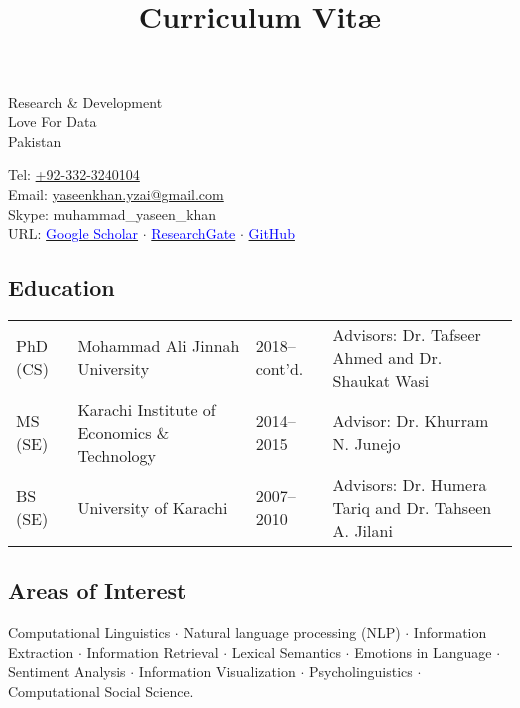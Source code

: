 \documentclass[a4paper, 10pt]{article}
\title{\vspace{-3em}{\bfseries\huge\textcolor{NavyBlue}{Muhammad Yaseen Khan}}
\\\small Curriculum Vit\ae}
\author{}
\date{}
\begin{document}
\maketitle
\vspace{-3em}
\begin{minipage}{0.49\textwidth}
Research \& Development\\
Love For Data\\
Pakistan\\
\hfill
\end{minipage}
\hfill
\begin{minipage}{0.49\textwidth}
Tel: \href{tel:+923323240104}{+92-332-3240104}\\
Email: \href{mailto:yaseenkhan.yzai@gmail.com}{yaseenkhan.yzai@gmail.com}\\
Skype: muhammad\_yaseen\_khan\\
URL: \href{https://scholar.google.com/citations?user=a_d2KTEAAAAJ&hl=en}{\textcolor{blue}{Google Scholar}} $\cdot$ \href{https://www.researchgate.net/profile/Muhammad_Yaseen_Khan}{\textcolor{blue}{ResearchGate}} $\cdot$ \href{https://www.github.com/MuhammadYaseenKhan}{\textcolor{blue}{GitHub}}
\end{minipage}


\subsection*{\textcolor{NavyBlue}{Education}}
{
\tabcolsep=3pt
\begin{tabular}{llll}
PhD (CS) & Mohammad Ali Jinnah University & 2018--cont'd. & Advisors: Dr. Tafseer Ahmed and Dr. Shaukat Wasi\\
MS (SE) & Karachi Institute of Economics \& Technology & 2014--2015 & Advisor: Dr. Khurram N. Junejo\\
BS (SE) & University of Karachi & 2007--2010 & Advisors: Dr. Humera Tariq and Dr. Tahseen A. Jilani\\
\end{tabular}
}

\subsection*{\textcolor{NavyBlue}{Areas of Interest}}
Computational Linguistics $\cdot$ Natural language processing (NLP) $\cdot$ Information Extraction $\cdot$ Information Retrieval $\cdot$ Lexical Semantics $\cdot$ Emotions in Language $\cdot$ Sentiment Analysis $\cdot$ Information Visualization $\cdot$ Psycholinguistics $\cdot$ Computational Social Science.
\end{document}
